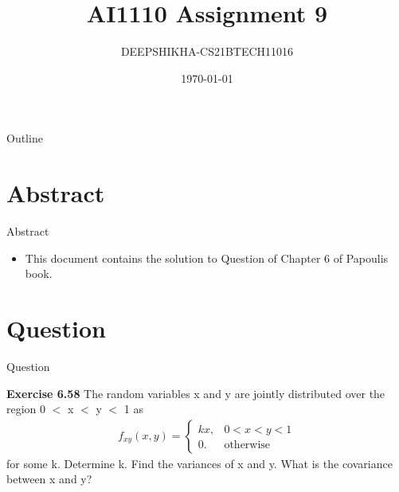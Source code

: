 \documentclass{beamer}
\title{AI1110 Assignment 9}
\author{DEEPSHIKHA-CS21BTECH11016}
\date{\today}
\providecommand{\brak}[1]{\ensuremath{\left(#1\right)}}
\begin{document}
\newcommand{\Int}{\int\limits}
\begin{frame}
		\titlepage
	\end{frame}

\begin{frame}{Outline}
\begin{block}
\tableofcontents
\end{block}
\end{frame}

\section{Abstract}
\begin{frame}{Abstract}
\begin{itemize}
\item 	This document contains the solution to Question of Chapter 6 of Papoulis book.
\end{itemize}
\end{frame}
	
\section{Question}
\begin{frame}{Question}
\begin{block}{\textbf{ Exercise 6.58}}
The random variables x and y are jointly distributed over the region 0 $<$ x $<$ y $<$ 1 as
\begin{align}
   f_{xy}\brak{x,y}=
\begin{cases}
kx, & 0<x<y<1\\
0. & \text{otherwise}
\end{cases} 
\end{align}
for some k. Determine k. Find the variances of x and y. What is the covariance between x and y? 

\end{block}
\end{frame}
	
\end{document}
